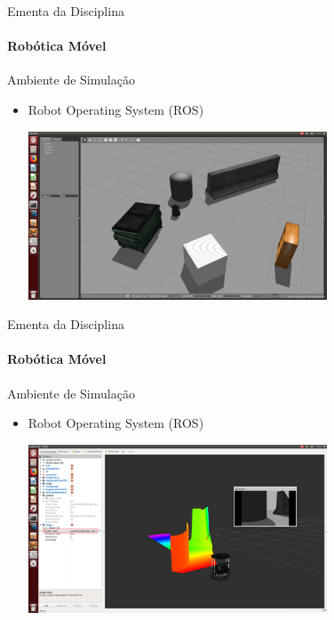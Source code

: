 \documentclass{beamer}
\begin{document}
\begin{frame}[t]{Ementa da Disciplina}
	\framesubtitle{Robótica Móvel}
	\begin{block}{Ambiente de Simulação}
	\end{block}

	\begin{itemize}
		\item  Robot Operating System (ROS)
		      \begin{center}
			      \includegraphics[width=0.7\textwidth]{./images/ros_example.png}
		      \end{center}
	\end{itemize}
\end{frame}


\begin{frame}[t]{Ementa da Disciplina}
	\framesubtitle{Robótica Móvel}
	\begin{block}{Ambiente de Simulação}
	\end{block}

	\begin{itemize}
		\item  Robot Operating System (ROS)
		      \begin{center}
			      \includegraphics[width=0.7\textwidth]{./images/ros_example_2.png}
		      \end{center}
	\end{itemize}
\end{frame}
\end{document}

